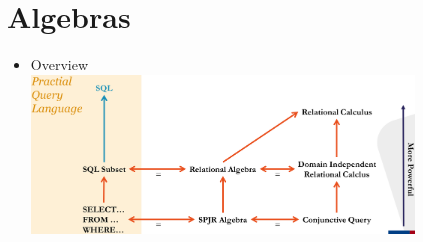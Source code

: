 
\section{Algebras}
\begin{itemize}
    \item Overview \\
    \includegraphics[width=0.8\textwidth]{./Figures/algebraOverview.png}
\end{itemize}

